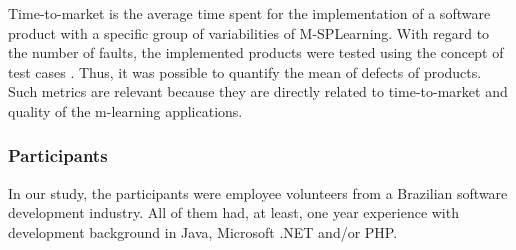 \begin{table}
%
\end{table}

Time-to-market is the average time spent for the implementation of a software product with a specific group of variabilities of M-SPLear\allowbreak ning. With regard to the number of faults, the implemented products were tested using the concept of test cases \cite{craig02}. Thus, it was possible to quantify the mean of defects of products. Such metrics are relevant because they are directly related to time-to-market and quality of the m-learning applications.

\subsubsection{Participants}

In our study, the participants were employee volunteers from a Brazilian software development industry. All of them had, at least, one year experience with development background in Java, Microsoft .NET and/or PHP.

